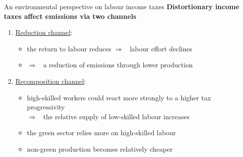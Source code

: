 \documentclass[11pt,aspectratio=169]{beamer}
\newcommand{\ar}{$\Rightarrow$ \ }
\begin{document}
\begin{frame}{An environmental perspective on labour income taxes}
\alert{\textbf{Distortionary income taxes affect emissions via two channels}}
\begin{enumerate}
	\item<+-> \underline{Reduction channel}: 
	\begin{itemize}
		\item the return to labour reduces \ar labour effort declines
		\item \ar a reduction of emissions through lower production
	\end{itemize}
	\item<+-> \underline{Recomposition channel}:
	\begin{itemize}
		\item  high-skilled workers could react more strongly to a higher tax progressivity \\ \ar the relative supply of low-skilled labour increases
		\item the green sector relies more on high-skilled labour
		\item non-green production becomes relatively cheaper
	\end{itemize}
\end{enumerate}
\end{frame}
\end{document}
